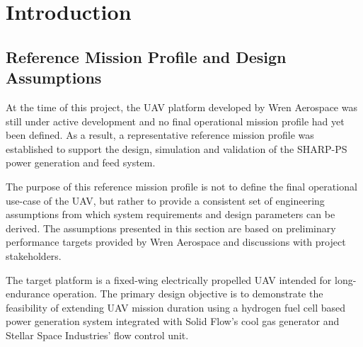 \chapter{Introduction}%
\label{chap:intro}
\newpage




\section{Reference Mission Profile and Design Assumptions}%
\label{sec:mission_scenario}
At the time of this project, the UAV platform developed by Wren Aerospace was still under active development and no final operational mission profile had yet been defined. As a result, a representative reference mission profile was established to support the design, simulation and validation of the SHARP-PS power generation and feed system.

The purpose of this reference mission profile is not to define the final operational use-case of the UAV, but rather to provide a consistent set of engineering assumptions from which system requirements and design parameters can be derived. The assumptions presented in this section are based on preliminary performance targets provided by Wren Aerospace and discussions with project stakeholders.

The target platform is a fixed-wing electrically propelled UAV intended for long-endurance operation. The primary design objective is to demonstrate the feasibility of extending UAV mission duration using a hydrogen fuel cell based power generation system integrated with Solid Flow’s cool gas generator and Stellar Space Industries’ flow control unit.

